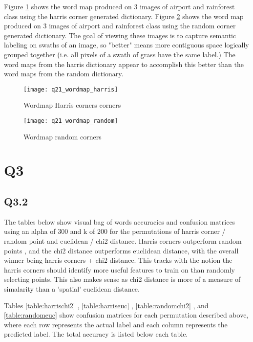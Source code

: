 \documentclass[12pt]{article}
\begin{document}
Figure \ref{fig:wordmapharris} shows the word map produced on 3 images of airport and rainforest class using the harris corner generated dictionary.
Figure \ref{fig:wordmaprandom} shows the word map produced on 3 images of airport and rainforest class using the random corner generated dictionary.
The goal of viewing these images is to capture semantic labeling on swaths of an image, so "better" means more contiguous space logically grouped together (i.e. all pixels of a swath of grass have the same label.) The word maps from the harris dictionary appear to accomplish this better than the word maps from the random dictionary.

\begin{figure}[H]
\centering
\texttt{[image: q21\_wordmap\_harris]}
\caption{Wordmap Harris corners corners}    
\label{fig:wordmapharris}
\end{figure}   


\begin{figure}[H]
\centering
\texttt{[image: q21\_wordmap\_random]}
\caption{Wordmap random corners}    
\label{fig:wordmaprandom}
\end{figure}   

\newpage
\section{Q3}
\subsection{Q3.2}

The tables below show visual bag of words accuracies and confusion matrices using an alpha of 300 and k of 200 for the permutations of harris corner / random point and euclidean / chi2 distance.  Harris corners outperform random points , and the chi2 distance outperforms euclidean distance, with the overall winner being harris corners + chi2 distance. This tracks with the notion the harris corners should identify more useful features to train on than randomly selecting points. This also makes sense as chi2 distance is more of a measure of simalarity than a 'spatial' euclidean distance.

Tables \ref{table:harrischi2} , \ref{table:harriseuc} , \ref{table:randomchi2} , and \ref{table:randomeuc} show confusion matrices for each permutation described above, where each row represents the actual label and each column represents the predicted label. The total accuracy is listed below each table.
\end{document}
